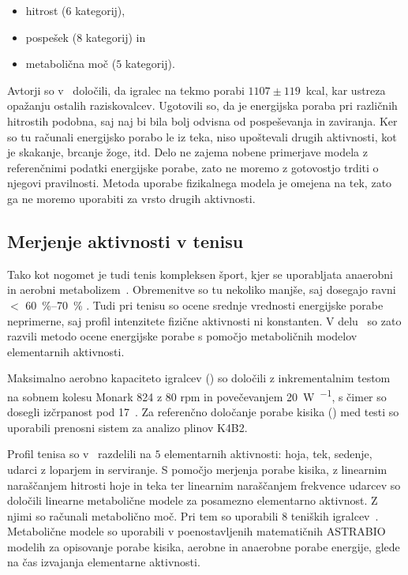 \begin{itemize}
\item hitrost ($6$ kategorij),
\item pospešek ($8$ kategorij) in
\item metabolična moč ($5$ kategorij).
\end{itemize}

Avtorji so v~\cite{osgnach2010energy} določili, da igralec na tekmo porabi $1107 \pm 119$~kcal, kar ustreza opažanju ostalih raziskovalcev. Ugotovili so, da je energijska poraba pri različnih hitrostih podobna, saj naj bi bila bolj odvisna od pospeševanja in zaviranja. Ker so tu računali energijsko porabo le iz teka, niso upoštevali drugih aktivnosti, kot je skakanje, brcanje žoge, itd. Delo ne zajema nobene primerjave modela z referenčnimi podatki energijske porabe, zato ne moremo z gotovostjo trditi o njegovi pravilnosti. Metoda uporabe fizikalnega modela je omejena na tek, zato ga ne moremo uporabiti za vrsto drugih aktivnosti.





\subsection{Merjenje aktivnosti v tenisu}

Tako kot nogomet je tudi tenis kompleksen šport, kjer se uporabljata anaerobni in aerobni metabolizem~\cite{botton2011energy}. Obremenitve so tu nekoliko manjše, saj dosegajo ravni $<$ \SIrange{60}{70}{\%} \vomax. Tudi pri tenisu so ocene srednje vrednosti energijske porabe neprimerne, saj profil intenzitete fizične aktivnosti ni konstanten. V delu~\cite{botton2011energy} so zato razvili metodo ocene energijske porabe s pomočjo metaboličnih modelov elementarnih aktivnosti. 

Maksimalno aerobno kapaciteto igralcev (\vomax) so določili z inkrementalnim testom na sobnem kolesu Monark 824 z 80 rpm in povečevanjem \SI{20}{W.\min^{-1}}, s čimer so dosegli izčrpanost pod \SI{17}{\min}~\cite{botton2011energy}. Za referenčno določanje porabe kisika (\vo) med testi so uporabili prenosni sistem za analizo plinov K4B2. 

Profil tenisa so v~\cite{botton2011energy} razdelili na $5$ elementarnih aktivnosti: hoja, tek, sedenje, udarci z loparjem in serviranje. S pomočjo merjenja porabe kisika, z linearnim naraščanjem hitrosti hoje in teka ter linearnim naraščanjem frekvence udarcev so določili linearne metabolične modele za posamezno elementarno aktivnost. Z njimi so računali metabolično moč. Pri tem so uporabili $8$ teniških igralcev~\cite{botton2011energy}. Metabolične modele so uporabili v poenostavljenih matematičnih ASTRABIO modelih za opisovanje porabe kisika, aerobne in anaerobne porabe energije, glede na čas izvajanja elementarne aktivnosti. 

